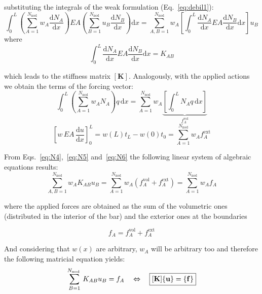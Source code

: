 \documentclass[spanish,a4paper,12pt]{article}
\begin{document}
substituting the integrals of the weak formulation (Eq.~\eqref{eq:debil1}):
\begin{equation}\label{eq:N4}
 \int_{0}^{L}\left(\sum_{A=1}^{N_{\mathrm{nod}}} w_{A} \frac{\mathrm{d} N_{A}}{\mathrm{d} x}\right) EA\left(\sum_{B=1}^{N_{\mathrm{nod}}} u_{B} \frac{\mathrm{d} N_{B}}{\mathrm{d} x}\right) \mathrm{d} x = \sum_{A, B=1}^{N_{\mathrm{nod}}} w_{A}\left[\left.\int_{0}^{L} \frac{\mathrm{d} N_{A}}{\mathrm{d} x} EA \frac{\mathrm{d} N_{B}}{\mathrm{d} x} \mathrm{d} x\right] u_{B}\right. 
\end{equation}
where
$$\int_{0}^{L} \frac{\mathrm{d} N_{A}}{\mathrm{d} x} EA \frac{\mathrm{d} N_{B}}{\mathrm{d} x} \mathrm{d} x = K_{AB}$$

which leads to the stiffness matrix $\left[\bm{K} \right]$. Analogously, with the applied actions we obtain the terms of the forcing vector:
\begin{equation}\label{eq:N5}
\int_{0}^{L}\left(\sum_{A=1}^{N_{\mathrm{nod}}} w_{A} N_{A}\right) q \,\mathrm{d} x=\sum_{A=1}^{N_{\mathrm{nod}}} w_{A} \underbrace{\left[\int_{0}^{L} N_{A} q \,\mathrm{d} x\right]}_{f_{A}^{\mathrm{vol}}}
\end{equation}
\begin{equation}\label{eq:N6}
\left[w \, EA \,\frac{\mathrm{d} u}{\mathrm{d}x} \right]^L_{0}=w(L) t_{L}-w(0) t_{0}=\sum_{A=1}^{N_{\mathrm{nod}}} w_{A} f_{A}^{\mathrm{ext}}
\end{equation}

From Eqs.~\eqref{eq:N4},~\eqref{eq:N5} and~\eqref{eq:N6} the following linear system of algebraic equations results:
\begin{equation}\label{eq:N7}
\sum_{A, B=1}^{N_{\mathrm{nod}}} w_{A} K_{A B} u_{B}=\sum_{A=1}^{N_{\mathrm{nod}}} w_{A}\left(f_{A}^{\mathrm{vol}}+f_{A}^{\mathrm{ext}}\right)=\sum_{A=1}^{N_{\mathrm{nod}}} w_{A} f_{A}
\end{equation}

where the applied forces are obtained as the sum of the volumetric ones (distributed in the interior of the bar) and the exterior ones at the boundaries

$$
f_{A}=f_{A}^{\mathrm{vol}}+f_{A}^{\mathrm{ext}}
$$

And considering that $w(x)$ are arbitrary, $w_{A}$ will be arbitrary too and therefore the following matricial equation yields:
\begin{equation}\label{eq:N8}
\sum_{B=1}^{N_{\text {nod }}} K_{A B} u_{B}=f_{A} \quad \Leftrightarrow \quad \fbox{$\displaystyle [\mathbf{K}]\{\mathbf{u}\}=\{\mathbf{f}\}$}
\end{equation}
\end{document}
